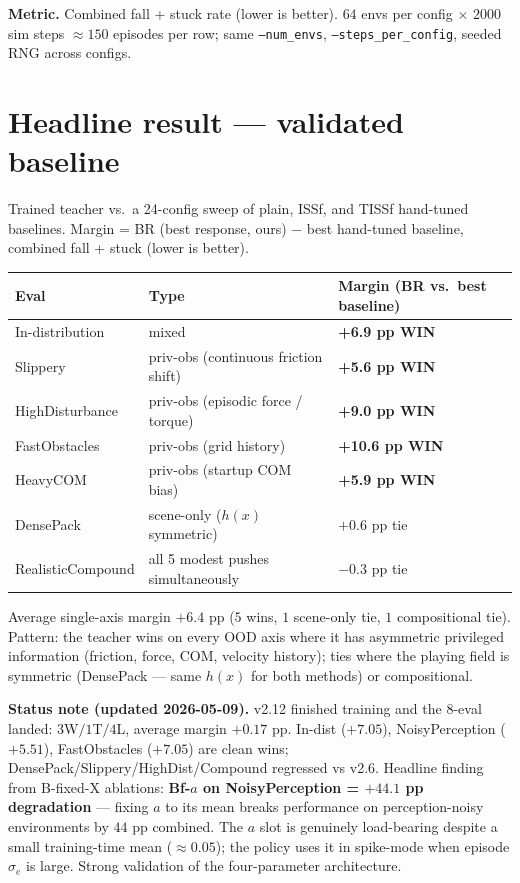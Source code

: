 \documentclass[11pt]{article}
\begin{document}
\noindent
\textbf{Metric.} Combined fall + stuck rate (lower is better). $64$ envs per
config $\times$ $2000$ sim steps $\approx 150$ episodes per row; same
\texttt{--num\_envs}, \texttt{--steps\_per\_config}, seeded RNG across configs.

\section{Headline result --- validated baseline}

Trained teacher vs.\ a 24-config sweep of plain, ISSf, and TISSf hand-tuned
baselines. Margin = BR (best response, ours) $-$ best hand-tuned baseline,
combined fall + stuck (lower is better).

\begin{small}
\begin{tabularx}{\linewidth}{@{}lXl@{}}
\toprule
Eval                & Type                                         & Margin (BR vs.\ best baseline) \\
\midrule
In-distribution     & mixed                                        & \textbf{+6.9 pp WIN} \\
Slippery            & priv-obs (continuous friction shift)         & \textbf{+5.6 pp WIN} \\
HighDisturbance     & priv-obs (episodic force / torque)           & \textbf{+9.0 pp WIN} \\
FastObstacles       & priv-obs (grid history)                      & \textbf{+10.6 pp WIN} \\
HeavyCOM            & priv-obs (startup COM bias)                  & \textbf{+5.9 pp WIN} \\
DensePack           & scene-only ($h(x)$ symmetric)                & $+0.6$ pp tie \\
RealisticCompound   & all 5 modest pushes simultaneously           & $-0.3$ pp tie \\
\bottomrule
\end{tabularx}
\end{small}

\noindent
Average single-axis margin $+6.4$ pp ($5$ wins, $1$ scene-only tie, $1$
compositional tie). Pattern: the teacher wins on every OOD axis where it has
asymmetric privileged information (friction, force, COM, velocity history);
ties where the playing field is symmetric (DensePack --- same $h(x)$ for both
methods) or compositional.

\noindent
\textbf{Status note (updated 2026-05-09).} v2.12 finished training and
the 8-eval landed: $3$W$/1$T$/4$L, average margin $+0.17$ pp. In-dist
($+7.05$), NoisyPerception ($+5.51$), FastObstacles ($+7.05$) are
clean wins; DensePack/Slippery/HighDist/Compound regressed vs v2.6.
Headline finding from B-fixed-X ablations: \textbf{Bf-$a$ on
NoisyPerception = $+44.1$ pp degradation} --- fixing $a$ to its mean
breaks performance on perception-noisy environments by $44$ pp combined.
The $a$ slot is genuinely load-bearing despite a small training-time
mean ($\approx 0.05$); the policy uses it in spike-mode when episode
$\sigma_e$ is large. Strong validation of the four-parameter architecture.
\end{document}
